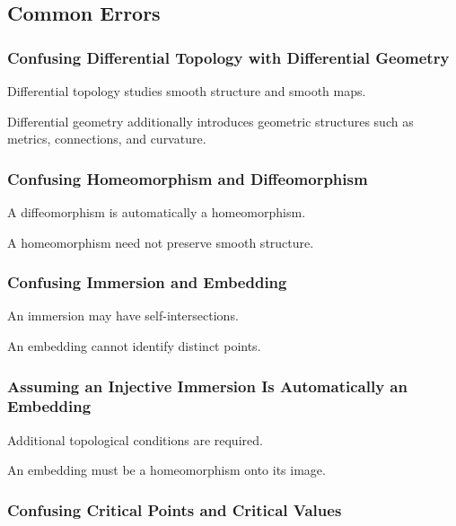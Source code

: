 \subsection{Common Errors}
\label{subsec:differential-topology-common-errors}

\subsubsection{Confusing Differential Topology with Differential Geometry}

Differential topology studies smooth structure and smooth maps.

Differential geometry additionally introduces geometric structures such as
metrics, connections, and curvature.

\subsubsection{Confusing Homeomorphism and Diffeomorphism}

A diffeomorphism is automatically a homeomorphism.

A homeomorphism need not preserve smooth structure.

\subsubsection{Confusing Immersion and Embedding}

An immersion may have self-intersections.

An embedding cannot identify distinct points.

\subsubsection{Assuming an Injective Immersion Is Automatically an Embedding}

Additional topological conditions are required.

An embedding must be a homeomorphism onto its image.

\subsubsection{Confusing Critical Points and Critical Values}

